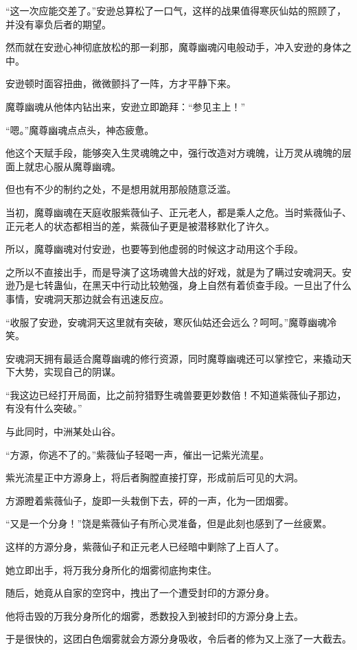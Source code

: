 \begin{this_body}
“这一次应能交差了。”安逊总算松了一口气，这样的战果值得寒灰仙姑的照顾了，并没有辜负后者的期望。

然而就在安逊心神彻底放松的那一刹那，魔尊幽魂闪电般动手，冲入安逊的身体之中。

安逊顿时面容扭曲，微微颤抖了一阵，方才平静下来。

魔尊幽魂从他体内钻出来，安逊立即跪拜：“参见主上！”

“嗯。”魔尊幽魂点点头，神态疲惫。

他这个天赋手段，能够突入生灵魂魄之中，强行改造对方魂魄，让万灵从魂魄的层面上就忠心服从魔尊幽魂。

但也有不少的制约之处，不是想用就用那般随意泛滥。

当初，魔尊幽魂在天庭收服紫薇仙子、正元老人，都是乘人之危。当时紫薇仙子、正元老人的状态都相当的差，紫薇仙子更是被潜移默化了许久。

所以，魔尊幽魂对付安逊，也要等到他虚弱的时候这才动用这个手段。

之所以不直接出手，而是导演了这场魂兽大战的好戏，就是为了瞒过安魂洞天。安逊乃是七转蛊仙，在黑天中行动比较勉强，身上自然有着侦查手段。一旦出了什么事情，安魂洞天那边就会有迅速反应。

“收服了安逊，安魂洞天这里就有突破，寒灰仙姑还会远么？呵呵。”魔尊幽魂冷笑。

安魂洞天拥有最适合魔尊幽魂的修行资源，同时魔尊幽魂还可以掌控它，来撬动天下大势，实现自己的阴谋。

“我这边已经打开局面，比之前狩猎野生魂兽要更妙数倍！不知道紫薇仙子那边，有没有什么突破。”

与此同时，中洲某处山谷。

“方源，你逃不了的。”紫薇仙子轻喝一声，催出一记紫光流星。

紫光流星正中方源身上，将后者胸膛直接打穿，形成前后可见的大洞。

方源瞪着紫薇仙子，旋即一头栽倒下去，砰的一声，化为一团烟雾。

“又是一个分身！”饶是紫薇仙子有所心灵准备，但是此刻也感到了一丝疲累。

这样的方源分身，紫薇仙子和正元老人已经暗中剿除了上百人了。

她立即出手，将万我分身所化的烟雾彻底拘束住。

随后，她竟从自家的空窍中，拽出了一个遭受封印的方源分身。

他将击毁的万我分身所化的烟雾，悉数投入到被封印的方源分身上去。

于是很快的，这团白色烟雾就会方源分身吸收，令后者的修为又上涨了一大截去。


\end{this_body}
